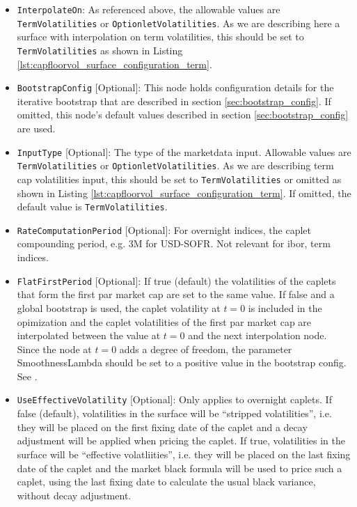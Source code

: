 \begin{itemize}
\item \lstinline!InterpolateOn!:
As referenced above, the allowable values are \lstinline!TermVolatilities! or \lstinline!OptionletVolatilities!. As we are describing here a surface with interpolation on term volatilities, this should be set to \lstinline!TermVolatilities! as shown in Listing \ref{lst:capfloorvol_surface_configuration_term}.

\item \lstinline!BootstrapConfig! [Optional]:
This node holds configuration details for the iterative bootstrap that are described in section \ref{sec:bootstrap_config}. If omitted, this node's default values described in section \ref{sec:bootstrap_config} are used.

\item \lstinline!InputType! [Optional]:
The type of the marketdata input. Allowable values are \lstinline!TermVolatilities! or \lstinline!OptionletVolatilities!. As we are describing term cap volatilities input, this should be set to \lstinline!TermVolatilities! or omitted as shown in Listing \ref{lst:capfloorvol_surface_configuration_term}. If omitted, the default value is \lstinline!TermVolatilities!.

\item \lstinline!RateComputationPeriod! [Optional]:
For overnight indices, the caplet compounding period, e.g. 3M for USD-SOFR. Not relevant for ibor, term indices.

\item \lstinline!FlatFirstPeriod! [Optional]:
If true (default) the volatilities of the caplets that form the first par market cap are set to the same value. If false
and a global bootstrap is used, the caplet volatility at $t=0$ is included in the opimization and the caplet
volatilities of the first par market cap are interpolated between the value at $t=0$ and the next interpolation
node. Since the node at $t=0$ adds a degree of freedom, the parameter SmoothnessLambda should be set to a positive value
in the bootstrap config. See \label{sec:bootstrap_config}.

\item \lstinline!UseEffectiveVolatility! [Optional]:
Only applies to overnight caplets. If false (default), volatilities in the surface will be ``stripped volatilities'',
i.e. they will be placed on the first fixing date of the caplet and a decay adjustment will be applied when pricing the
caplet. If true, volatilities in the surface will be ``effective volatliities'', i.e. they will be placed on the last
fixing date of the caplet and the market black formula will be used to price such a caplet, using the last fixing date
to calculate the usual black variance, without decay adjustment.

\end{itemize}

